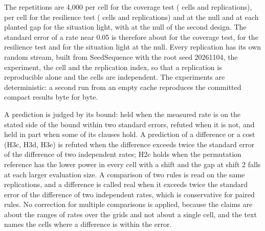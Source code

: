 The repetitions are 4,000 per cell for the coverage test (\CovTotalCells{} cells and \CovTotalReps{} replications), \ShReps{} per cell for the resilience test (\ShCells{} cells and \ShTotalReps{} replications) and \SiRepsNull{} at the null and \SiRepsGap{} at each planted gap for the situation light, with \SiInRepsNull{} at the null of the second design. The standard error of a rate near 0.05 is therefore about \CovSeBBB{} for the coverage test, \ShSePermDZ{} for the resilience test and \SiSeCutFifteenSmallZ{} for the situation light at the null. Every replication has its own random stream, built from $\mathrm{SeedSequence}$ with the root seed 20261104, the experiment, the cell and the replication index, so that a replication is reproducible alone and the cells are independent. The experiments are deterministic: a second run from an empty cache reproduces the committed compact results byte for byte.

A prediction is judged by its bound: held when the measured rate is on the stated side of the bound within two standard errors, refuted when it is not, and held in part when some of its clauses hold. A prediction of a difference or a cost (H3c, H3d, H3e) is refuted when the difference exceeds twice the standard error of the difference of two independent rates; H2c holds when the permutation reference has the lower power in every cell with a shift and the gap at shift 2 falls at each larger evaluation size. A comparison of two rules is read on the same replications, and a difference is called real when it exceeds twice the standard error of the difference of two independent rates, which is conservative for paired rules. No correction for multiple comparisons is applied, because the claims are about the ranges of rates over the grids and not about a single cell, and the text names the cells where a difference is within the error.
